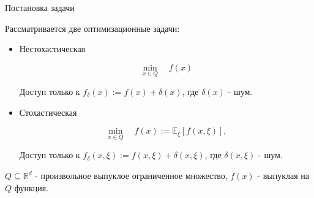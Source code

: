 \documentclass{beamer}
\begin{document}
\begin{frame}{Постановка задачи}

    Рассматривается две оптимизационные задачи:\\

    \begin{itemize}
        \item Нестохастическая
                
                \begin{equation*}
                    \underset{x \in Q}{\min} \quad f(x)
                \end{equation*}

            Доступ только к $f_{\delta}(x) := f(x) + \delta(x)$, где $\delta(x)$ - шум.

        \item Стохастическая
        
                \begin{equation*}
                    \underset{x \in Q}{\min} \quad f(x) := 
                    \mathbb{E}_{\xi}\left[f(x, \xi)\right],
                \end{equation*}

                
            Доступ только к $f_{\delta}(x, \xi) := f(x, \xi) + \delta(x, \xi)$, где $\delta(x, \xi)$ - шум.

    \end{itemize}

        $Q \subseteq \mathbb{R}^d$ - произвольное выпуклое ограниченное множество, $f(x)$ - выпуклая на $Q$ функция.
   
\end{frame}

\end{document}
